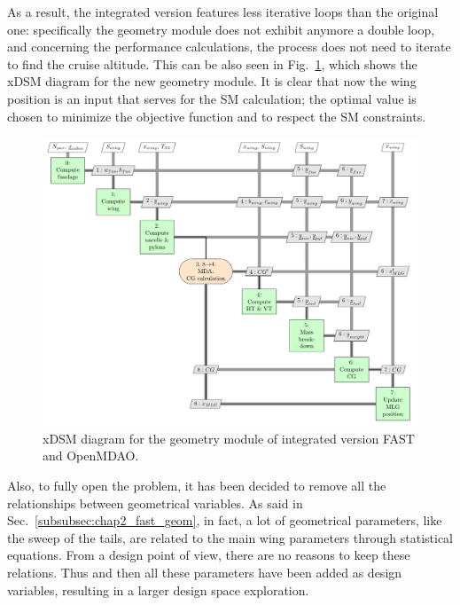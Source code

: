 As a result, the integrated version features less iterative loops than the original one: specifically the geometry module does not exhibit anymore a double loop, and concerning the performance calculations, the process does not need to iterate to find the cruise altitude. 
This can be also seen in Fig.~\ref{fig:fast_openmdao_basic_geom}, which shows the xDSM diagram for the new geometry module. 
It is clear that now the wing position is an input that serves for the SM calculation; the optimal value is chosen to minimize the objective function and to respect the SM constraints. 
\begin{figure}[!h]
	\centering
	\includegraphics[keepaspectratio, width=\textwidth]{images/chap2/FAST_OpenMDAO_basic_geom}
	\caption{xDSM diagram for the geometry module of integrated version FAST and OpenMDAO.}
	\label{fig:fast_openmdao_basic_geom}
\end{figure}

Also, to fully open the problem, it has been decided to remove all the relationships between geometrical variables. 
As said in Sec.~\ref{subsubsec:chap2_fast_geom}, in fact, a lot of geometrical parameters, like the sweep of the tails, are related to the main wing parameters through statistical equations. 
From a design point of view, there are no reasons to keep these relations.
Thus and then all these parameters have been added as design variables, resulting in a larger design space exploration.

